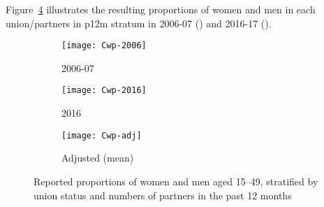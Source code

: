 Figure~\ref{fig:Cwp} illustrates the resulting
proportions of women and men in each union/partners in p12m stratum
in 2006-07 () and 2016-17 ().
\begin{figure}
  \centering
  \begin{subfigure}{0.7\linewidth}
    \centering
    \texttt{[image: Cwp-2006]}
    \caption{2006-07 \cite{SDHS2006}}
    \label{fig:Cwp.2006}
  \end{subfigure}
  \begin{subfigure}{0.7\linewidth}
    \centering
    \texttt{[image: Cwp-2016]}
    \caption{2016 \cite{SHIMS2}}
    \label{fig:Cwp.2016}
  \end{subfigure}
  \begin{subfigure}{0.7\linewidth}
    \centering
    \texttt{[image: Cwp-adj]}
    \caption{Adjusted (mean)}
    \label{fig:Cwp.adj}
  \end{subfigure}
  \caption{Reported proportions of women and men aged 15--49,
    stratified by union status and numbers of partners in the past 12 months}
  \label{fig:Cwp}
\end{figure}
